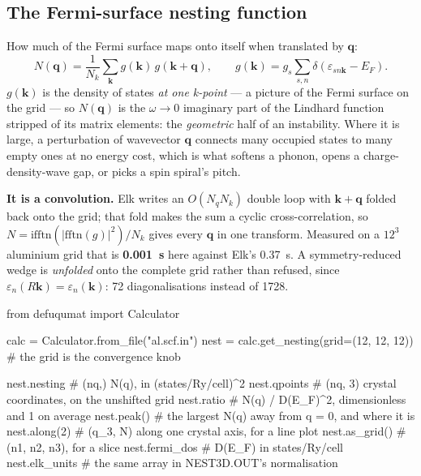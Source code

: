 \documentclass[11pt,a4paper]{article}
\begin{document}
\subsection{The Fermi-surface nesting function}

How much of the Fermi surface maps onto itself when translated by $\mathbf q$:
\begin{equation*}
  N(\mathbf q) = \frac{1}{N_k}\sum_{\mathbf k} g(\mathbf k)\, g(\mathbf k + \mathbf q),
  \qquad
  g(\mathbf k) = g_s \sum_{s,n} \delta(\varepsilon_{sn\mathbf k} - E_F).
\end{equation*}
$g(\mathbf k)$ is the density of states \emph{at one k-point} --- a picture of
the Fermi surface on the grid --- so $N(\mathbf q)$ is the $\omega\to0$
imaginary part of the Lindhard function stripped of its matrix elements: the
\emph{geometric} half of an instability. Where it is large, a perturbation of
wavevector $\mathbf q$ connects many occupied states to many empty ones at no
energy cost, which is what softens a phonon, opens a charge-density-wave gap, or
picks a spin spiral's pitch.

\textbf{It is a convolution.} Elk writes an $O(N_q N_k)$ double loop with
$\mathbf k + \mathbf q$ folded back onto the grid; that fold makes the sum a
cyclic cross-correlation, so $N = \mathrm{ifftn}(|\mathrm{fftn}(g)|^2)/N_k$
gives every $\mathbf q$ in one transform. Measured on a $12^3$ aluminium grid
that is \textbf{0.001~s} here against Elk's 0.37~s. A symmetry-reduced wedge is
\emph{unfolded} onto the complete grid rather than refused, since
$\varepsilon_n(R\mathbf k) = \varepsilon_n(\mathbf k)$: 72 diagonalisations
instead of 1728.

\begin{pycode}
from defuqumat import Calculator

calc = Calculator.from_file("al.scf.in")
nest = calc.get_nesting(grid=(12, 12, 12))   # the grid is the convergence knob

nest.nesting        # (nq,) N(q), in (states/Ry/cell)^2
nest.qpoints        # (nq, 3) crystal coordinates, on the unshifted grid
nest.ratio          # N(q) / D(E_F)^2, dimensionless and 1 on average
nest.peak()         # the largest N(q) away from q = 0, and where it is
nest.along(2)       # (q_3, N) along one crystal axis, for a line plot
nest.as_grid()      # (n1, n2, n3), for a slice
nest.fermi_dos      # D(E_F) in states/Ry/cell
nest.elk_units      # the same array in NEST3D.OUT's normalisation
\end{pycode}
\end{document}

